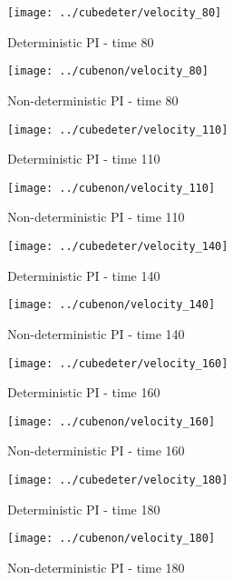 \begin{figure}[H]
 \centering 
 \texttt{[image: ../cubedeter/velocity\_80]}
 \caption{Deterministic PI - time 80}
\end{figure}

\begin{figure}[H]
 \centering 
 \texttt{[image: ../cubenon/velocity\_80]}
 \caption{Non-deterministic PI - time 80}
\end{figure}

\begin{figure}[H]
 \centering 
 \texttt{[image: ../cubedeter/velocity\_110]}
 \caption{Deterministic PI - time 110}
\end{figure}

\begin{figure}[H]
 \centering 
 \texttt{[image: ../cubenon/velocity\_110]}
 \caption{Non-deterministic PI - time 110}
\end{figure}

\begin{figure}[H]
 \centering 
 \texttt{[image: ../cubedeter/velocity\_140]}
 \caption{Deterministic PI - time 140}
\end{figure}

\begin{figure}[H]
 \centering 
 \texttt{[image: ../cubenon/velocity\_140]}
 \caption{Non-deterministic PI - time 140}
\end{figure}

\begin{figure}[H]
 \centering 
 \texttt{[image: ../cubedeter/velocity\_160]}
 \caption{Deterministic PI - time 160}
\end{figure}

\begin{figure}[H]
 \centering 
 \texttt{[image: ../cubenon/velocity\_160]}
 \caption{Non-deterministic PI - time 160}
\end{figure}

\begin{figure}[H]
 \centering 
 \texttt{[image: ../cubedeter/velocity\_180]}
 \caption{Deterministic PI - time 180}
\end{figure}

\begin{figure}[H]
 \centering 
 \texttt{[image: ../cubenon/velocity\_180]}
 \caption{Non-deterministic PI - time 180}
\end{figure}

